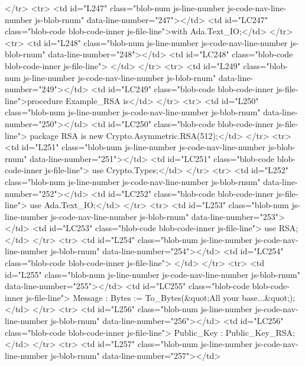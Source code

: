         </tr>
        <tr>
          <td id="L247" class="blob-num js-line-number js-code-nav-line-number js-blob-rnum" data-line-number="247"></td>
          <td id="LC247" class="blob-code blob-code-inner js-file-line">with Ada.Text_IO;</td>
        </tr>
        <tr>
          <td id="L248" class="blob-num js-line-number js-code-nav-line-number js-blob-rnum" data-line-number="248"></td>
          <td id="LC248" class="blob-code blob-code-inner js-file-line">
</td>
        </tr>
        <tr>
          <td id="L249" class="blob-num js-line-number js-code-nav-line-number js-blob-rnum" data-line-number="249"></td>
          <td id="LC249" class="blob-code blob-code-inner js-file-line">procedure Example_RSA is</td>
        </tr>
        <tr>
          <td id="L250" class="blob-num js-line-number js-code-nav-line-number js-blob-rnum" data-line-number="250"></td>
          <td id="LC250" class="blob-code blob-code-inner js-file-line">   package RSA is new Crypto.Asymmetric.RSA(512);</td>
        </tr>
        <tr>
          <td id="L251" class="blob-num js-line-number js-code-nav-line-number js-blob-rnum" data-line-number="251"></td>
          <td id="LC251" class="blob-code blob-code-inner js-file-line">   use Crypto.Types;</td>
        </tr>
        <tr>
          <td id="L252" class="blob-num js-line-number js-code-nav-line-number js-blob-rnum" data-line-number="252"></td>
          <td id="LC252" class="blob-code blob-code-inner js-file-line">   use Ada.Text_IO;</td>
        </tr>
        <tr>
          <td id="L253" class="blob-num js-line-number js-code-nav-line-number js-blob-rnum" data-line-number="253"></td>
          <td id="LC253" class="blob-code blob-code-inner js-file-line">   use RSA;</td>
        </tr>
        <tr>
          <td id="L254" class="blob-num js-line-number js-code-nav-line-number js-blob-rnum" data-line-number="254"></td>
          <td id="LC254" class="blob-code blob-code-inner js-file-line">
</td>
        </tr>
        <tr>
          <td id="L255" class="blob-num js-line-number js-code-nav-line-number js-blob-rnum" data-line-number="255"></td>
          <td id="LC255" class="blob-code blob-code-inner js-file-line">   Message : Bytes := To_Bytes(&quot;All your base...&quot;);</td>
        </tr>
        <tr>
          <td id="L256" class="blob-num js-line-number js-code-nav-line-number js-blob-rnum" data-line-number="256"></td>
          <td id="LC256" class="blob-code blob-code-inner js-file-line">   Public_Key  : Public_Key_RSA;</td>
        </tr>
        <tr>
          <td id="L257" class="blob-num js-line-number js-code-nav-line-number js-blob-rnum" data-line-number="257"></td>

